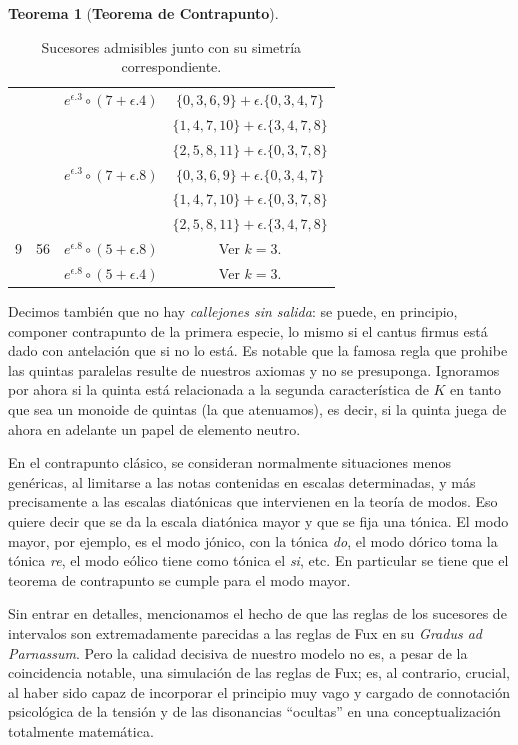 \documentclass[letterpaper,12pt]{book}
\theoremstyle{definition} \newtheorem{Def}{Definición}[chapter]
\theoremstyle{definition} \newtheorem{Teo}{Teorema}[chapter]
\theoremstyle{definition} \newtheorem{Pro}{Proposición}[chapter]
\theoremstyle{definition} \newtheorem{Lema}{Lema}[chapter]
\begin{document}
\begin{Teo}[\textbf{Teorema de Contrapunto}]
\begin{enumerate}
\begin{table}
\begin{tabular}{|c|c|c|c|}
& &$e^{\epsilon{.}3}\circ (7+\epsilon{.}4)$ & $\{0,3,6,9\}+\epsilon.\{0,3,4,7\}$\\
& & &$\{1,4,7,10\}+\epsilon.\{3,4,7,8\}$\\
& & &$\{2,5,8,11\}+\epsilon.\{0,3,7,8\}$\\\cline{3-4}
& &$e^{\epsilon{.}3}\circ(7+\epsilon{.}8)$ &$\{0,3,6,9\}+\epsilon.\{0,3,4,7\}$\\
& & &$\{1,4,7,10\}+\epsilon.\{0,3,7,8\}$\\
& & &$\{2,5,8,11\}+\epsilon.\{3,4,7,8\}$\\
\hline
9 & 56 & $e^{\epsilon{.}8}\circ (5+\epsilon{.}8)$ & Ver $k = 3$.\\\cline{3-4}
& &$e^{\epsilon{.}8}\circ (5+\epsilon{.}4)$ & Ver $k = 3$.\\
\hline
\end{tabular}
\caption{\label{Sucesores}Sucesores admisibles junto con su simetría correspondiente.}
\end{table}
\end{enumerate}  
\end{Teo}

Decimos también que no hay \emph{callejones sin salida}: se puede, en principio, componer contrapunto de la primera especie, lo mismo si el cantus firmus está dado con antelación que si no lo está. Es notable que la famosa regla que prohibe las quintas paralelas resulte de nuestros axiomas y no se presuponga. Ignoramos por ahora si la quinta está relacionada a la segunda característica de $K$ en tanto que sea un monoide de quintas (la que atenuamos), es decir, si la quinta juega de ahora en adelante un papel de elemento neutro.

En el contrapunto clásico, se consideran normalmente situaciones menos genéricas, al limitarse a las notas contenidas en escalas determinadas, y más precisamente a las escalas diatónicas que intervienen en la teoría de modos. Eso quiere decir que se da la escala diatónica mayor y que se fija una tónica. El modo mayor, por ejemplo, es el modo jónico, con la tónica \emph{do}, el modo dórico toma la tónica \emph{re}, el modo eólico tiene como tónica el \emph{si}, etc. En particular se  tiene que el teorema de contrapunto se cumple para el modo mayor.

Sin entrar en detalles, mencionamos el hecho de que las reglas de los sucesores de intervalos son extremadamente parecidas a las reglas de Fux en su \emph{Gradus ad Parnassum}. Pero la calidad decisiva de nuestro modelo no es, a pesar de la coincidencia notable, una simulación de las reglas de Fux; es, al contrario, crucial, al haber sido capaz de incorporar el principio muy vago y cargado de connotación psicológica de la tensión y de las disonancias ``ocultas'' en una conceptualización totalmente matemática. 
\end{document}
